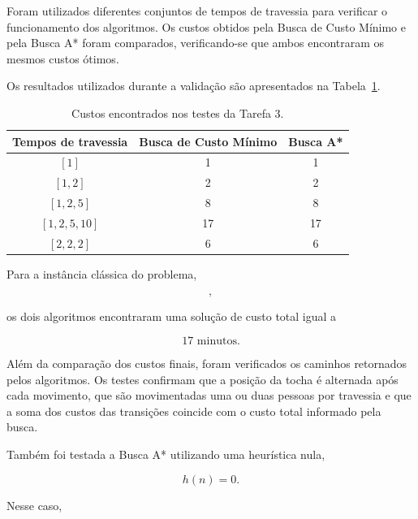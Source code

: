 Foram utilizados diferentes conjuntos de tempos de travessia para verificar o
funcionamento dos algoritmos. Os custos obtidos pela Busca de Custo Mínimo e
pela Busca A* foram comparados, verificando-se que ambos encontraram os mesmos
custos ótimos.

Os resultados utilizados durante a validação são apresentados na
Tabela~\ref{tab:testes-tarefa3}.

\begin{table}[H]
	\centering
	\caption{Custos encontrados nos testes da Tarefa 3.}
	\label{tab:testes-tarefa3}
	\begin{tabular}{ccc}
		\toprule
		Tempos de travessia & Busca de Custo Mínimo & Busca A* \\
		\midrule
		$[1]$               & 1                     & 1        \\
		$[1,2]$             & 2                     & 2        \\
		$[1,2,5]$           & 8                     & 8        \\
		$[1,2,5,10]$        & 17                    & 17       \\
		$[2,2,2]$           & 6                     & 6        \\
		\bottomrule
	\end{tabular}
\end{table}

Para a instância clássica do problema,

\begin{equation}
	[1,2,5,10],
\end{equation}

os dois algoritmos encontraram uma solução de custo total igual a

\begin{equation}
	17 \text{ minutos}.
\end{equation}

Além da comparação dos custos finais, foram verificados os caminhos retornados
pelos algoritmos. Os testes confirmam que a posição da tocha é alternada após
cada movimento, que são movimentadas uma ou duas pessoas por travessia e que a
soma dos custos das transições coincide com o custo total informado pela
busca.

Também foi testada a Busca A* utilizando uma heurística nula,

\begin{equation}
	h(n)=0.
\end{equation}

Nesse caso,

